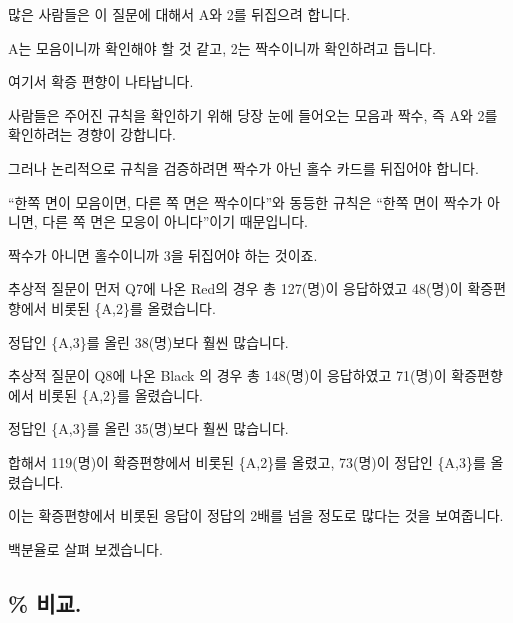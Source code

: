\documentclass[
]{book}
\begin{document}
많은 사람들은 이 질문에 대해서 A와 2를 뒤집으려 합니다.

A는 모음이니까 확인해야 할 것 같고, 2는 짝수이니까 확인하려고 듭니다.

여기서 확증 편향이 나타납니다.

사람들은 주어진 규칙을 확인하기 위해 당장 눈에 들어오는 모음과 짝수, 즉 A와 2를 확인하려는 경향이 강합니다.

그러나 논리적으로 규칙을 검증하려면 짝수가 아닌 홀수 카드를 뒤집어야 합니다.

``한쪽 면이 모음이면, 다른 쪽 면은 짝수이다''와 동등한 규칙은 ``한쪽 면이 짝수가 아니면, 다른 쪽 면은 모응이 아니다''이기 때문입니다.

짝수가 아니면 홀수이니까 3을 뒤집어야 하는 것이죠.

추상적 질문이 먼저 Q7에 나온 Red의 경우 총 127(명)이 응답하였고 48(명)이 확증편향에서 비롯된 \{A,2\}를 올렸습니다.

정답인 \{A,3\}를 올린 38(명)보다 훨씬 많습니다.

추상적 질문이 Q8에 나온 Black 의 경우 총 148(명)이 응답하였고 71(명)이 확증편향에서 비롯된 \{A,2\}를 올렸습니다.

정답인 \{A,3\}를 올린 35(명)보다 훨씬 많습니다.

합해서 119(명)이 확증편향에서 비롯된 \{A,2\}를 올렸고, 73(명)이 정답인 \{A,3\}를 올렸습니다.

이는 확증편향에서 비롯된 응답이 정답의 2배를 넘을 정도로 많다는 것을 보여줍니다.

백분율로 살펴 보겠습니다.

\subsection{\% 비교.}\label{uxbe44uxad50.-4}
\end{document}
